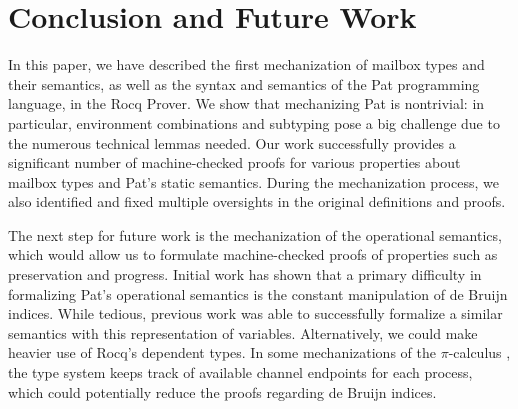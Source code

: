 \section{Conclusion and Future Work}
\label{chap:conclusion}

In this paper, we have described the first mechanization of mailbox types and
their semantics, as well as the syntax and semantics of the Pat programming
language, in the Rocq Prover.
%
We show that mechanizing Pat is nontrivial: in particular, environment
combinations and subtyping pose a big challenge due to the numerous
technical lemmas needed.
%
Our work successfully provides a significant number of
machine-checked proofs for various properties about mailbox types and Pat's
static semantics.  During the mechanization process, we also identified and
fixed multiple oversights in the original definitions and proofs.

The next step for future work is the mechanization of the operational semantics,
which would allow us to formulate machine-checked proofs of properties such as
preservation and progress.
%
Initial work has shown that a primary difficulty in formalizing Pat's
operational semantics is the constant manipulation of de Bruijn indices.  While
tedious, previous work \cite{zalakainLeftoversMechanisationAgda2021} was able to
successfully formalize a similar semantics with this representation of
variables.
%
Alternatively, we could make heavier use of Rocq's dependent types.  In some
mechanizations of the $\pi$-calculus \cite{ambalHOPiCoq2021}, the type system
keeps track of available channel endpoints for each process, which could
potentially reduce the proofs regarding de Bruijn indices.

